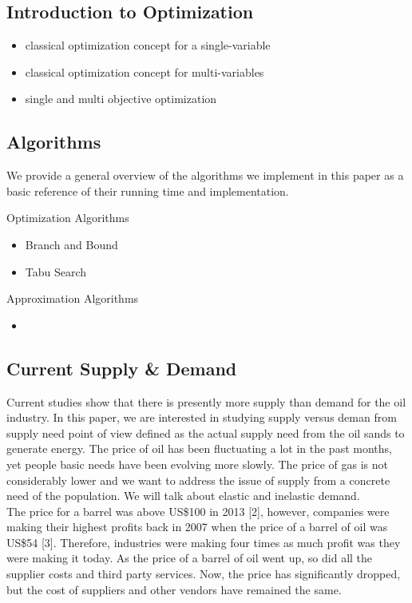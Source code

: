 \documentclass[12pt]{article}
\begin{document}
\subsection{Introduction to Optimization}

\begin{itemize}
\item classical optimization concept for a single-variable
\item classical optimization concept for multi-variables
\item single and multi objective optimization
\end{itemize}

\subsection{Algorithms}

We provide a general overview of the algorithms we implement in this paper as a basic reference of their running time and implementation.

Optimization Algorithms
\begin{itemize}
\item Branch and Bound
\item Tabu Search
\end{itemize}

Approximation Algorithms
\begin{itemize}
\item
\end{itemize}

\subsection{Current Supply \& Demand}

Current studies show that there is presently more supply than demand for the oil industry. In this paper, we are interested in studying supply versus deman from supply need point of view defined as the actual supply need from the oil sands to generate energy. The price of oil has been fluctuating a lot in the past months, yet people basic needs have been evolving more slowly. The price of gas is not considerably lower and we want to address the issue of  supply from a concrete need of the population. We will talk about elastic and inelastic demand. \\

The price for a barrel was above US\$100 in 2013 [2], however, companies were making their highest profits back in 2007 when the price of a barrel of oil was US\$54 [3]. Therefore, industries were making four times as much profit was they were making it today. As the price of a barrel of oil went up, so did all the supplier costs and third party services. Now, the price has significantly dropped, but the cost of suppliers and other vendors have remained the same. \\
\end{document}
